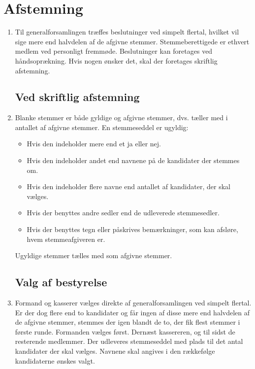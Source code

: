\documentclass[a4paper, 10pt]{article}
\newenvironment{stykenum}{
  \begin{enumerate}[%
    label=Stk.~\arabic*., ref=\textsection~\theenumi~Stk.~\arabic*, start=1]
}{\end{enumerate}}
\begin{document}
\section{Afstemning}
\begin{stykenum}

\item Til generalforsamlingen træffes beslutninger ved simpelt flertal,
hvilket vil sige mere end halvdelen af de afgivne stemmer.
Stemmeberettigede er ethvert med\-lem ved personligt fremmøde.
Beslutninger kan foretages ved håndsoprækning. Hvis nogen ønsker det,
skal der foretages skriftlig afstemning.

\subsection*{Ved skriftlig afstemning}

\item Blanke stemmer er både gyldige og afgivne stemmer, dvs. tæller med i
antallet af afgivne stemmer. En stemmeseddel er ugyldig:

\begin{itemize}

\item Hvis den indeholder mere end et ja eller nej.

\item Hvis den indeholder andet end navnene på de kandidater der
stemmes om.

\item Hvis den indeholder flere navne end antallet af kandidater, der
skal væl\-ges.

\item Hvis der benyttes andre sedler end de udleverede stemmesedler.

\item Hvis der benyttes tegn eller påskrives bemærkninger, som kan
afsløre, hvem stemmeafgiveren er.

\end{itemize}

Ugyldige stemmer tælles med som afgivne stemmer.

\subsection*{Valg af bestyrelse}

\item Formand og kasserer vælges direkte af generalforsamlingen ved simpelt
flertal. Er der dog flere end to kandidater og får ingen af disse mere
end halvdelen af de afgivne stemmer, stemmes der igen blandt de to,
der fik flest stemmer i første runde. Formanden vælges først. Dernæst
kassereren, og til sidst de resterende medlemmer. Der udleveres
stemmeseddel med plads til det antal kandidater der skal vælges.
Navnene skal angives i den rækkefølge kandidaterne ønskes valgt.


\end{stykenum}
\end{document}
